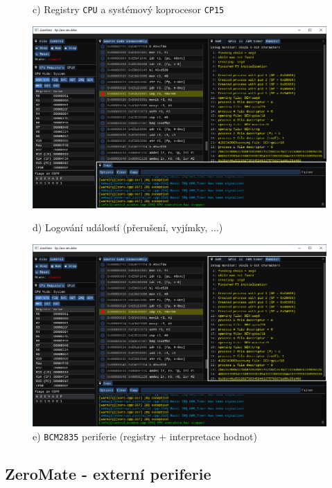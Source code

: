 \documentclass[compress]{beamer}
\begin{document}
\begin{frame}
\begin{overlayarea}{\textwidth}{\textheight}
\begin{figure}
{				\vspace{-0.4cm}
				\caption{c) Registry \texttt{CPU} a systémový koprocesor \texttt{CP15}}
			}%
			{%
				\includegraphics[width=.85\textwidth]{img/gui/04.pdf}%
				\vspace{-0.4cm}
				\caption{d) Logování událostí (přerušení, vyjímky, ...)}
			}%
			{%
				\includegraphics[width=.85\textwidth]{img/gui/05.pdf}%
				\vspace{-0.4cm}
				\caption{e) \texttt{BCM2835} periferie (registry + interpretace hodnot)}
			}%
		\end{figure}
	\end{overlayarea}      
\end{frame}

\subsection{ZeroMate - externí periferie}
\end{document}
